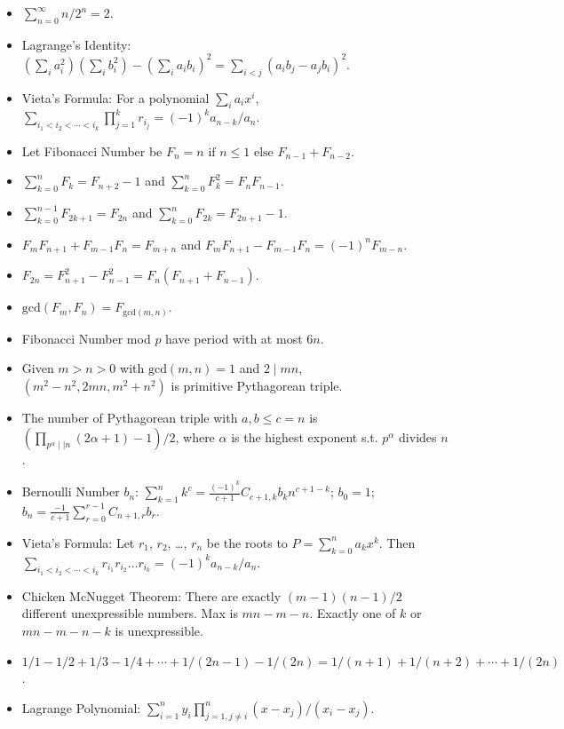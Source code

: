 \begin{itemize}
	\item $\sum_{n=0}^{\infty} n/2^n = 2$.
	\item Lagrange's Identity: $(\sum_{i} a_i^2)(\sum_{i} b_i^2) - (\sum_{i} a_i b_i)^2 = \sum_{i < j} (a_i b_j - a_j b_i)^2$.
	\item Vieta's Formula: For a polynomial $\sum_i a_i x^i$, $\sum_{i_1 < i_2 < \cdots < i_k} \prod_{j=1}^{k} r_{i_j} = (-1)^k a_{n-k} / a_n$.
	\item Let Fibonacci Number be $F_n = n \text{ if } n \le 1 \text{ else } F_{n-1} + F_{n-2}$.
	\item $\sum_{k=0}^{n} F_k = F_{n+2} - 1$ and $\sum_{k=0}^{n} F_k^2 = F_{n} F_{n-1}$.
	\item $\sum_{k=0}^{n-1} F_{2k+1} = F_{2n}$ and $\sum_{k=0}^{n} F_{2k} = F_{2n+1}-1$.
	\item $F_{m} F_{n+1} + F_{m-1} F_{n} = F_{m+n}$ and $F_{m} F_{n+1} - F_{m-1} F_{n} = (-1)^n F_{m-n}$.
	\item $F_{2n} = F_{n+1}^2 - F_{n-1}^2 = F_n(F_{n+1} + F_{n-1})$.
	\item $\mathrm{gcd}(F_m, F_n) = F_{\mathrm{gcd}(m, n)}$.
	\item Fibonacci Number mod $p$ have period with at most $6n$.
	\item Given $m > n > 0$ with $\mathrm{gcd}(m, n) = 1$ and $2 \mid mn$, $(m^2-n^2, 2mn, m^2+n^2)$ is primitive Pythagorean triple.
	\item The number of Pythagorean triple with $a, b \le c = n$ is $(\prod_{p^\alpha \mid\mid n} (2\alpha + 1) - 1) / 2$, where $\alpha$ is the highest exponent s.t. $p^\alpha$ divides $n$.
	\item Bernoulli Number $b_n$: $\sum_{k=1}^{n} k^c = \frac{(-1)^k}{c+1} C_{c+1, k} b_k n^{c+1-k}$; $b_0 = 1$; $b_n = \frac{-1}{c+1} \sum_{r=0}^{r-1} C_{n+1, r} b_r$.
	\item Vieta's Formula: Let $r_1$, $r_2$, \dots, $r_n$ be the roots to $P = \sum_{k=0}^{n} a_k x^k$. Then $\sum_{i_1 < i_2 < \cdots < i_k} r_{i_1} r_{i_2} \dots r_{i_k} = (-1)^k a_{n-k}/a_n$.
	\item Chicken McNugget Theorem: There are exactly $(m-1)(n-1)/2$ different unexpressible numbers. Max is $mn-m-n$. Exactly one of $k$ or $mn-m-n-k$ is unexpressible.
	\item $1/1 - 1/2 + 1/3 - 1/4 + \cdots + 1/(2n-1) - 1/(2n) = 1/(n+1) + 1/(n+2) + \cdots + 1/(2n)$.
	\item Lagrange Polynomial: $\sum_{i=1}^{n} y_i \prod_{j=1,j \neq i}^{n} (x-x_j)/(x_i-x_j)$.
\end{itemize}

